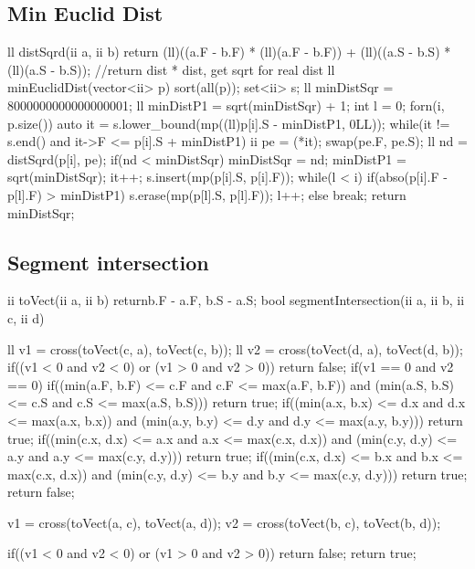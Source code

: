 \documentclass[10pt, landscape, twocolumn, a4paper, notitlepage]{article}
\begin{document}
\subsection{Min Euclid Dist}
\begin{code}
ll distSqrd(ii a, ii b) {
    return (ll)((a.F - b.F) * (ll)(a.F - b.F)) + (ll)((a.S - b.S) * (ll)(a.S - b.S));
} 
//return dist * dist, get sqrt for real dist
ll minEuclidDist(vector<ii> p) {
    sort(all(p));
    set<ii> s;
    ll minDistSqr = 8000000000000000001;
    ll minDistP1 = sqrt(minDistSqr) + 1;
    int l = 0;
    forn(i, p.size()) {
        auto it = s.lower_bound(mp((ll)p[i].S - minDistP1, 0LL));
        while(it != s.end() and it->F <= p[i].S + minDistP1) {
            ii pe = (*it);
            swap(pe.F, pe.S);
            ll nd = distSqrd(p[i], pe);
            if(nd < minDistSqr) {
                minDistSqr = nd;
                minDistP1 = sqrt(minDistSqr);
            }
            it++;
        }
        s.insert(mp(p[i].S, p[i].F));
        while(l < i) {
            if(abso(p[i].F - p[l].F) > minDistP1) {
                s.erase(mp(p[l].S, p[l].F));
                l++;
            }
            else break;
        }
    }
    return minDistSqr;
}
\end{code}
\subsection{Segment intersection}
\begin{code}
ii toVect(ii a, ii b) {
    return{b.F - a.F, b.S - a.S};
} 
bool segmentIntersection(ii a, ii b, ii c, ii d){
    ll v1 = cross(toVect(c, a), toVect(c, b));
    ll v2 = cross(toVect(d, a), toVect(d, b));
    if((v1 < 0 and v2 < 0) or (v1 > 0 and v2 > 0)) {
        return false;
    }
    if(v1 == 0 and v2 == 0) {
        if((min(a.F, b.F) <= c.F and c.F <= max(a.F, b.F)) and
            (min(a.S, b.S) <= c.S and c.S <= max(a.S, b.S))) {
                return true;
            }
        if((min(a.x, b.x) <= d.x and d.x <= max(a.x, b.x)) and
            (min(a.y, b.y) <= d.y and d.y <= max(a.y, b.y))) {
                return true;
            }
        if((min(c.x, d.x) <= a.x and a.x <= max(c.x, d.x)) and
            (min(c.y, d.y) <= a.y and a.y <= max(c.y, d.y))) {
                return true;
            }
        if((min(c.x, d.x) <= b.x and b.x <= max(c.x, d.x)) and
            (min(c.y, d.y) <= b.y and b.y <= max(c.y, d.y))) {
                return true;
            }
        return false;
    }
    
    v1 = cross(toVect(a, c), toVect(a, d));
    v2 = cross(toVect(b, c), toVect(b, d));
    
    if((v1 < 0 and v2 < 0) or (v1 > 0 and v2 > 0)) {
        return false;
    }
    return true;
}
\end{code}
\end{document}
